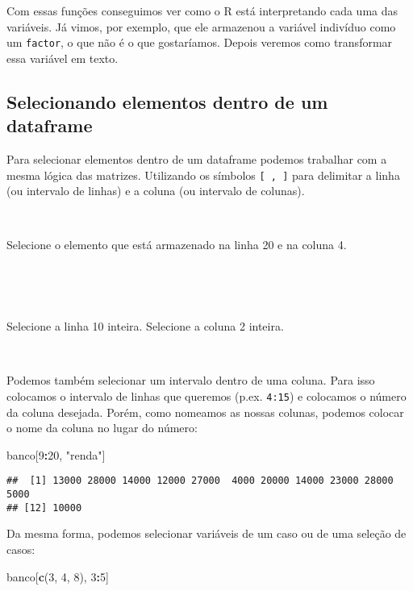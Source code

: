 \documentclass[]{book}
\newenvironment{Shaded}{\begin{snugshade}}{\end{snugshade}}
\newcommand{\DecValTok}[1]{\textcolor[rgb]{0.00,0.00,0.81}{#1}}
\newcommand{\KeywordTok}[1]{\textcolor[rgb]{0.13,0.29,0.53}{\textbf{#1}}}
\newcommand{\NormalTok}[1]{#1}
\newcommand{\OperatorTok}[1]{\textcolor[rgb]{0.81,0.36,0.00}{\textbf{#1}}}
\newcommand{\StringTok}[1]{\textcolor[rgb]{0.31,0.60,0.02}{#1}}
\theoremstyle{definition}
\theoremstyle{definition}
\theoremstyle{definition}
\theoremstyle{remark}
\let\BeginKnitrBlock\begin \let\EndKnitrBlock\end
\begin{document}
Com essas funções conseguimos ver como o R está interpretando cada uma das variáveis. Já vimos, por exemplo, que ele armazenou a variável indivíduo como um \texttt{factor}, o que não é o que gostaríamos. Depois veremos como transformar essa variável em texto.

\hypertarget{selecionando-elementos-dentro-de-um-dataframe}{%
\subsection{Selecionando elementos dentro de um dataframe}\label{selecionando-elementos-dentro-de-um-dataframe}}

Para selecionar elementos dentro de um dataframe podemos trabalhar com a mesma lógica das matrizes. Utilizando os símbolos \texttt{{[}\ ,\ {]}} para delimitar a linha (ou intervalo de linhas) e a coluna (ou intervalo de colunas).

~
\BeginKnitrBlock{exercise}
\protect\hypertarget{exr:unnamed-chunk-73}{}{\label{exr:unnamed-chunk-73} }Selecione o elemento que está armazenado na linha 20 e na coluna 4.
\EndKnitrBlock{exercise}

~

~
\BeginKnitrBlock{exercise}
\protect\hypertarget{exr:unnamed-chunk-74}{}{\label{exr:unnamed-chunk-74} }Selecione a linha 10 inteira. Selecione a coluna 2 inteira.
\EndKnitrBlock{exercise}

~

Podemos também selecionar um intervalo dentro de uma coluna. Para isso colocamos o intervalo de linhas que queremos (p.ex. \texttt{4:15}) e colocamos o número da coluna desejada. Porém, como nomeamos as nossas colunas, podemos colocar o nome da coluna no lugar do número:

\begin{Shaded}
\begin{Highlighting}[]
\NormalTok{banco[}\DecValTok{9}\OperatorTok{:}\DecValTok{20}\NormalTok{, }\StringTok{"renda"}\NormalTok{]}
\end{Highlighting}
\end{Shaded}

\begin{verbatim}
##  [1] 13000 28000 14000 12000 27000  4000 20000 14000 23000 28000  5000
## [12] 10000
\end{verbatim}

Da mesma forma, podemos selecionar variáveis de um caso ou de uma seleção de casos:

\begin{Shaded}
\begin{Highlighting}[]
\NormalTok{banco[}\KeywordTok{c}\NormalTok{(}\DecValTok{3}\NormalTok{, }\DecValTok{4}\NormalTok{, }\DecValTok{8}\NormalTok{), }\DecValTok{3}\OperatorTok{:}\DecValTok{5}\NormalTok{]}
\end{Highlighting}
\end{Shaded}
\end{document}
